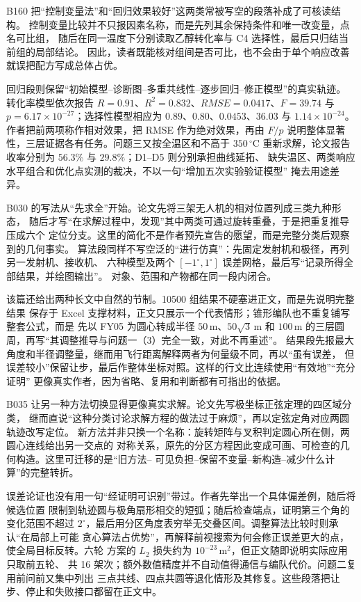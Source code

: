 \documentclass[UTF8,a4paper,12pt]{ctexart}
\begin{document}
B160 把“控制变量法”和“回归效果较好”这两类常被写空的段落补成了可核读结构。
控制变量比较并不只报因素名称，而是先列其余保持条件和唯一改变量，点名可比组，
随后在同一温度下分别读取乙醇转化率与 C4 选择性，最后只归结当前组的局部结论。
因此，读者既能核对组间是否可比，也不会由于单个响应改善就误把配方写成总体占优。

回归段则保留“初始模型--诊断图--多重共线性--逐步回归--修正模型”的真实轨迹。
转化率模型依次报告 $R=0.91$、$R^2=0.832$、$RMSE=0.0417$、$F=39.74$ 与
$p=6.17\times10^{-27}$；选择性模型相应为 $0.89$、$0.80$、$0.0453$、$36.03$ 与
$1.14\times10^{-24}$。作者把前两项称作相对效果，把 RMSE 作为绝对效果，再由 $F/p$
说明整体显著性，三层证据各有任务。问题三又按全温区和不高于 $350\,^{\circ}\mathrm{C}$
重新求解，论文报告收率分别为 $56.3\%$ 与 $29.8\%$；D1--D5 则分别承担曲线延拓、
缺失温区、两类响应水平组合和优化点实测的裁决，不以一句“增加五次实验验证模型”
掩去用途差异。

B030 的写法从“先求全”开始。论文先将三架无人机的相对位置列成三类九种形态，
随后才写“在求解过程中，发现”其中两类可通过旋转重叠，于是把重复推导压成六个
定位分支。这里的简化不是作者预先宣告的愿望，而是完整分类后观察到的几何事实。
算法段同样不写空泛的“进行仿真”：先固定发射机和极径，再列另一发射机、接收机、
六种模型及两个 $[-1^\circ,1^\circ]$ 误差网格，最后写“记录所得全部结果，并绘图输出”。
对象、范围和产物都在同一段内闭合。

该篇还给出两种长文中自然的节制。10500 组结果不硬塞进正文，而是先说明完整结果
保存于 Excel 支撑材料，正文只展示一个代表情形；锥形编队也不重复铺写整套公式，而是
先以 FY05 为圆心转成半径 $50\,\mathrm{m}$、$50\sqrt{3}\,\mathrm{m}$ 和
$100\,\mathrm{m}$ 的三层圆周，再写“其调整推导与问题一（3）完全一致，对此不再重述”。
结果段先报最大角度和半径调整量，继而用飞行距离解释两者为何量级不同，再以“虽有误差，
但误差较小”保留让步，最后作整体坐标对照。这样的行文比连续使用“有效地”“充分证明”
更像真实作者，因为省略、复用和判断都有可指出的依据。

B035 让另一种方法切换显得更像真实求解。论文先写极坐标正弦定理的四区域分类，
继而直说“这种分类讨论求解方程的做法过于麻烦”，再以定弦定角对应两圆轨迹改写定位。
新方法并非只换一个名称：旋转矩阵与叉积判定圆心所在侧，两圆心连线给出另一交点的
对称关系，原先的分区方程因此变成可画、可检查的几何构造。这里可迁移的是“旧方法--
可见负担--保留不变量--新构造--减少什么计算”的完整转折。

误差论证也没有用一句“经证明可识别”带过。作者先举出一个具体偏差例，随后将候选位置
限制到轨迹圆与极角扇形相交的短弧；随后检查端点，证明第三个角的变化范围不超过
$2^\circ$，最后用分区角度表穷举无交叠区间。调整算法比较时则承认“在局部上可能
贪心算法占优势”，再解释前视搜索为何会修正误差更大的点，使全局目标反转。六轮
方案的 $L_2$ 损失约为 $10^{-23}\,\mathrm{m}^2$，但正文随即说明实际应用只取前五轮、
共 16 架次；额外数值精度并不自动值得通信与编队代价。问题二复用前问前又集中列出
三点共线、四点共圆等退化情形及其修复。这些段落把让步、停止和失败接口都留在正文中。
\end{document}
